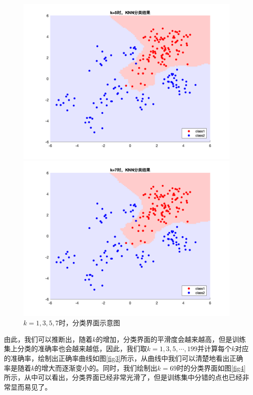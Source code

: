 \documentclass[cn]{elegantbook}
\begin{document}
\begin{figure}[!h]
\begin{minipage}[h]{0.48\linewidth}
\end{minipage}
\begin{minipage}[h]{0.48\linewidth}
	\centering
	\includegraphics[width=\textwidth]{images/knnres3}
\end{minipage}
\begin{minipage}[h]{0.48\linewidth}
	\centering
	\includegraphics[width=\textwidth]{images/knnres4}
\end{minipage}
\caption{\label{knnres}$k=1,3,5,7$时，分类界面示意图}
\end{figure}

由此，我们可以推断出，随着$k$的增加，分类界面的平滑度会越来越高，但是训练集上分类的准确率也会越来越低，因此，我们取$k=1,3,5,\cdots,199$并计算每个$k$对应的准确率，绘制出正确率曲线如图\ref{fig3}所示，从曲线中我们可以清楚地看出正确率是随着$k$的增大而逐渐变小的。同时，我们绘制出$k=69$时的分类界面如图\ref{fig4}所示，从中可以看出，分类界面已经非常光滑了，但是训练集中分错的点也已经非常显而易见了。
\end{document}
